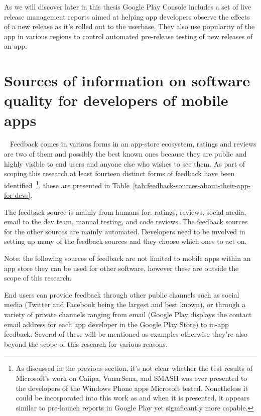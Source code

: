 As we will discover later in this thesis Google Play Console includes a set of live release management reports aimed at helping app developers observe the effects of a new release as it's rolled out to the userbase. They also use popularity of the app in various regions to control automated pre-release testing of new releases of an app.


\section{Sources of information on software quality for developers of mobile apps}~\label{rw-sources-of-info-on-software-quality-for-devs-of-mobile-apps}
Feedback comes in various forms in an app-store ecosystem, ratings and reviews are two of them and possibly the best known ones because they are public and highly visible to end users and anyone else who wishes to see them. As part of scoping this research at least fourteen distinct forms of feedback have been identified~\footnote{As discussed in the previous section, it's not clear whether the test results of Microsoft's work on Caiipa, VanarSena, and SMASH was ever presented to the developers of the Windows Phone apps Microsoft tested. Nonetheless it could be incorporated into this work as and when it is presented, it appears similar to pre-launch reports in Google Play yet significantly more capable.}, these are presented in Table~\ref{tab:feedback-sources-about-their-app-for-devs}.

The feedback source is mainly from humans for: ratings, reviews, social media, email to the dev team, manual testing, and code reviews. The feedback sources for the other sources are mainly automated. Developers need to be involved in setting up many of the feedback sources and they choose which ones to act on.

Note: the following sources of feedback are not limited to mobile apps within an app store they can be used for other software, however these are outside the scope of this research.

End users can provide feedback through other public channels such as social media (Twitter and Facebook being the largest and best known), or through a variety of private channels ranging from email (Google Play displays the contact email address for each app developer in the Google Play Store) to in-app feedback. Several of these will be mentioned as examples otherwise they're also beyond the scope of this research for various reasons. 

